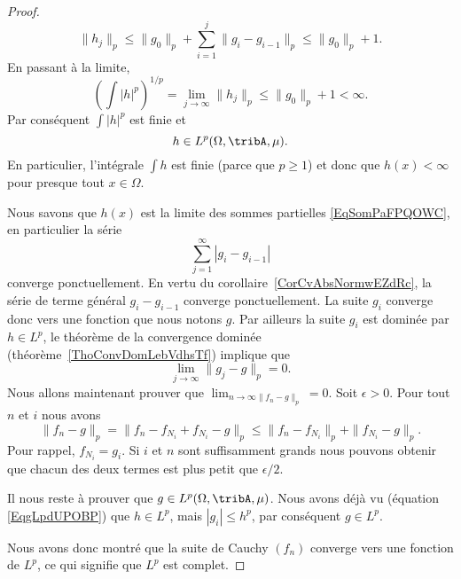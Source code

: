 \begin{proof}
    \begin{equation}
        \|h_j\|_p\leq \|g_0\|_p+\sum_{i=1}^j\|g_i-g_{i-1}\|_p\leq \|g_0\|_p+1.
    \end{equation}
    En passant à la limite,
    \begin{equation}
        \left( \int| h |^p \right)^{1/p}=\lim_{j\to \infty}\|h_j\|_p \leq \|g_0\|_p+1<\infty.
    \end{equation}
    Par conséquent \( \int| h |^p\) est finie et
    \begin{equation}    \label{EqgLpdUPOBP}
        h\in L^p(\Omega,\tribA,\mu).
    \end{equation}
    En particulier, l'intégrale \( \int h\) est finie (parce que \( p\geq 1\)) et donc que \( h(x)<\infty\) pour presque tout \( x\in\Omega\).

    Nous savons que \( h(x)\) est la limite des sommes partielles \eqref{EqSomPaFPQOWC}, en particulier la série
    \begin{equation}
        \sum_{j=1}^{\infty}| g_i-g_{i-1} |
    \end{equation}
    converge ponctuellement. En vertu du corollaire~\ref{CorCvAbsNormwEZdRc}, la série de terme général \( g_i-g_{i-1}\) converge ponctuellement. La suite \( g_i\) converge donc vers une fonction que nous notons \( g\). Par ailleurs la suite \( g_i\) est dominée par \( h\in L^p\), le théorème de la convergence dominée (théorème~\ref{ThoConvDomLebVdhsTf}) implique que
    \begin{equation}
        \lim_{j\to \infty} \|g_j-g\|_p=0.
    \end{equation}
    Nous allons maintenant prouver que \( \lim_{n\to \infty\|f_n-g\|_p} =0\). Soit \( \epsilon>0\). Pour tout \( n\) et \( i\) nous avons
    \begin{equation}
        \|f_n-g\|_p=\|f_n-f_{N_i}+f_{N_i}-g\|_p\leq\|f_n-f_{N_i}\|_p+\|f_{N_i}-g\|_p.
    \end{equation}
    Pour rappel, \( f_{N_i}=g_i\). Si \(i\) et \( n\) sont suffisamment grands nous pouvons obtenir que chacun des deux termes est plus petit que \( \epsilon/2\).

    Il nous reste à prouver que \( g\in L^p(\Omega,\tribA,\mu)\). Nous avons déjà vu (équation \eqref{EqgLpdUPOBP}) que \( h\in L^p\), mais \( | g_i |\leq h^p\), par conséquent  \( g\in L^p\).

    Nous avons donc montré que la suite de Cauchy \( (f_n)\) converge vers une fonction de \( L^p\), ce qui signifie que \( L^p\) est complet.
\end{proof}

